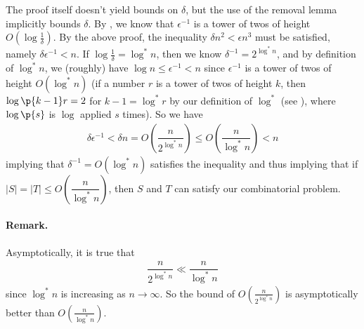 The proof itself doesn't yield bounds on $\delta$, but the use of the removal lemma implicitly bounds $\delta$. By \cite{Fox11}, we know that $\epsilon^{-1}$ is a tower of twos of height $O\left(\log \frac{1}{\delta}\right)$. By the above proof, the inequality $\delta n^2 < \epsilon n^3$ must be satisfied, namely $\delta \epsilon^{-1} < n$. If $\log \frac{1}{\delta} = \log^* n$, then we know $\delta^{-1} = 2^{\log^* n}$, and by definition of $\log^* n$, we (roughly) have $\log n \leq \epsilon^{-1} < n$ since $\epsilon^{-1}$ is a tower of twos of height $O(\log^* n)$ (if a number $r$ is a tower of twos of height $k$, then $\log\p{k-1} r = 2$ for $k-1 = \log^* r$ by our definition of $\log^*$ (see ), where $\log\p{s}$ is $\log$ applied $s$ times). So we have
\begin{align*}
	\delta \epsilon^{-1} < \delta n = O\left(\dfrac{n}{2^{\log^* n}}\right) \leq O\left(\dfrac{n}{\log^* n}\right) < n
\end{align*}
implying that $\delta^{-1} = O(\log^* n)$ satisfies the inequality and thus implying that if $|S|=|T| \leq O\left(\dfrac{n}{\log^* n}\right)$, then $S$ and $T$ can satisfy our combinatorial problem.

\paragraph{Remark.} Asymptotically, it is true that
\begin{align*}
	\dfrac{n}{2^{\log^*n}} \ll \dfrac{n}{\log^* n}
\end{align*}
since $\log^* n$ is increasing as $n \rightarrow \infty$. So the bound of $O\left(\frac{n}{2^{\log^* n}}\right)$ is asymptotically better than $O\left(\frac{n}{\log^* n}\right)$.